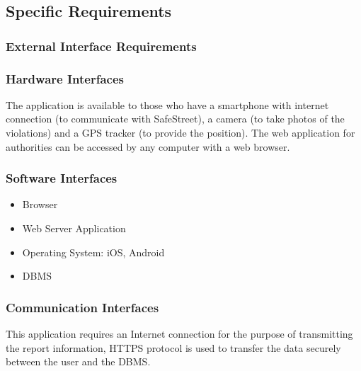 \subsection{Specific Requirements}

\subsubsection{External Interface Requirements}

\subsubsection{Hardware Interfaces}

The application is available to those who have a smartphone with internet connection (to communicate with SafeStreet), a camera (to take photos of the violations) and a GPS tracker (to provide the position).
The web application for authorities can be accessed by any computer with a web browser.

\subsubsection{Software Interfaces}

\begin{itemize}

\item Browser
\item Web Server Application
\item Operating System: iOS, Android
\item DBMS

\end{itemize} 

\subsubsection{Communication Interfaces}

This application requires an Internet connection for the purpose of transmitting the report information, HTTPS protocol is used to transfer the data securely between the user and the DBMS.

